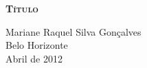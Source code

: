 \documentclass[normaltoc, ruledheader]{abnt}
\begin{document}
\begin{titlepage}


\begin{center}
\vfill
\begin{Large}
\textbf{ \textsc{Título}} \\[7cm]            
\end{Large}
Mariane Raquel Silva Gonçalves	 \\[3cm]
Belo Horizonte \\ Abril de 2012 \\ 
\end{center}
\end{titlepage}


\end{document}
